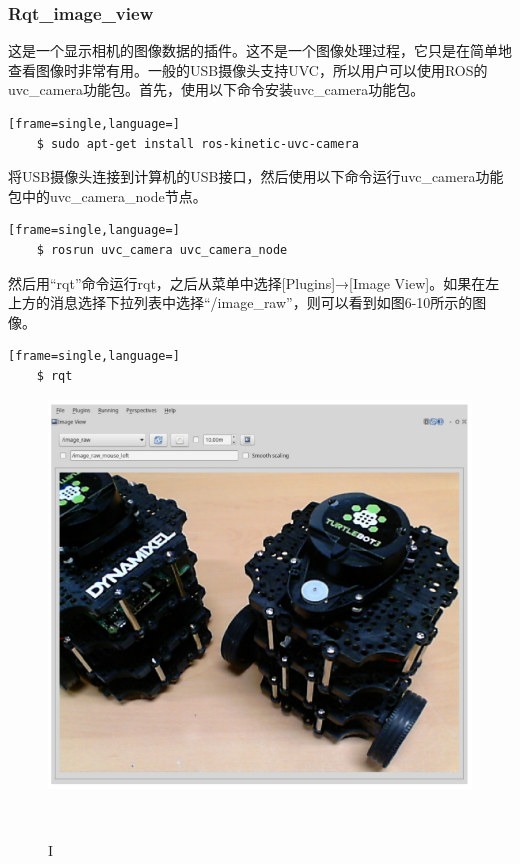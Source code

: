 \documentclass[geye,green,kindle,cn]{elegantnote}
\begin{document}
\subsubsection{Rqt\_image\_view}
这是一个显示相机的图像数据的插件。这不是一个图像处理过程，它只是在简单地查看图像时非常有用。一般的USB摄像头支持UVC，所以用户可以使用ROS的uvc\_camera功能包。首先，使用以下命令安装uvc\_camera功能包。
\begin{lstlisting}[frame=single,language=]
    $ sudo apt-get install ros-kinetic-uvc-camera
\end{lstlisting}

将USB摄像头连接到计算机的USB接口，然后使用以下命令运行uvc\_camera功能包中的uvc\_camera\_node节点。
\begin{lstlisting}[frame=single,language=]
    $ rosrun uvc_camera uvc_camera_node
\end{lstlisting}

然后用“rqt”命令运行rqt，之后从菜单中选择[Plugins]→[Image View]。如果在左上方的消息选择下拉列表中选择“/image\_raw”，则可以看到如图6-10所示的图像。
\begin{lstlisting}[frame=single,language=]
    $ rqt 
\end{lstlisting}

\begin{figure}[htbp]
    \centering
    \includegraphics[width=1\linewidth]{src/I.png}
    \centering
    \caption{I} \label{picture:I}
\end{figure}
\end{document}
